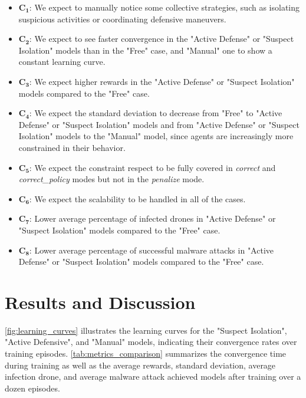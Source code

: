 \begin{itemize}
    \item $\mathbf{C_1}$: We expect to manually notice some collective strategies, such as isolating suspicious activities or coordinating defensive maneuvers.
    \item $\mathbf{C_2}$: We expect to see faster convergence in the "Active Defense" or "Suspect Isolation" models than in the "Free" case, and "Manual" one to show a constant learning curve.
    \item $\mathbf{C_3}$: We expect higher rewards in the "Active Defense" or "Suspect Isolation" models compared to the "Free" case.
    \item $\mathbf{C_{4}}$: We expect the standard deviation to decrease from "Free" to "Active Defense" or "Suspect Isolation" models and from "Active Defense" or "Suspect Isolation" models to the "Manual" model, since agents are increasingly more constrained in their behavior.
    \item $\mathbf{C_{5}}$: We expect the constraint respect to be fully covered in \textit{correct} and \textit{correct\_policy} modes but not in the \textit{penalize} mode.
    \item $\mathbf{C_{6}}$: We expect the scalability to be handled in all of the cases.
    \item $\mathbf{C_7}$: Lower average percentage of infected drones in "Active Defense" or "Suspect Isolation" models compared to the "Free" case.
    \item $\mathbf{C_8}$: Lower average percentage of successful malware attacks in "Active Defense" or "Suspect Isolation" models compared to the "Free" case.

\end{itemize}

\section{Results and Discussion}\label{sec:results_and_discussion}

\autoref{fig:learning_curves} illustrates the learning curves for the "Suspect Isolation", "Active Defensive", and "Manual" models, indicating their convergence rates over training episodes.
\autoref{tab:metrics_comparison} summarizes the convergence time during training as well as the average rewards, standard deviation, average infection drone, and average malware attack achieved models after training over a dozen episodes.

